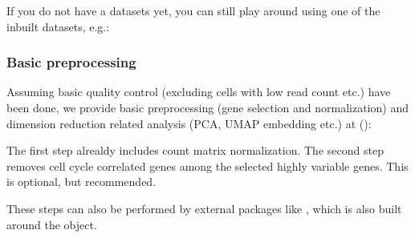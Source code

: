 \documentclass[letterpaper,10pt,english]{sphinxmanual}
\begin{document}
If you do not have a datasets yet, you can still play around using one of the in\sphinxhyphen{}built datasets, e.g.:

\begin{sphinxVerbatim}[commandchars=\\\{\}]
  
\end{sphinxVerbatim}


\subsubsection{Basic preprocessing}
\label{\detokenize{getting_started:basic-preprocessing}}
Assuming basic quality control (excluding cells with low read count etc.) have been done, we provide basic preprocessing (gene selection and normalization) and dimension reduction related analysis (PCA, UMAP embedding etc.)  at ():

\begin{sphinxVerbatim}[commandchars=\\\{\}]
\end{sphinxVerbatim}

The first step  alrealdy includes count matrix normalization. The second step removes cell cycle correlated genes among the selected highly variable genes.
This is optional, but recommended.

These steps can also be performed by  external packages like , which is also built around the  object.
\end{document}
